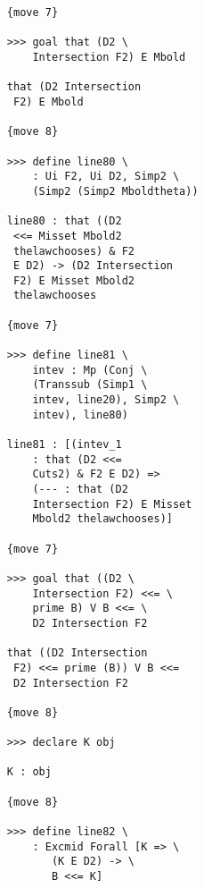 \documentclass[12pt]{article}
\begin{document}
\begin{verbatim}
                        {move 7}

                        >>> goal that (D2 \
                            Intersection F2) E Mbold

                        that (D2 Intersection 
                         F2) E Mbold

                        {move 8}

                        >>> define line80 \
                            : Ui F2, Ui D2, Simp2 \
                            (Simp2 (Simp2 Mboldtheta))

                        line80 : that ((D2 
                         <<= Misset Mbold2 
                         thelawchooses) & F2 
                         E D2) -> (D2 Intersection 
                         F2) E Misset Mbold2 
                         thelawchooses

                        {move 7}

                        >>> define line81 \
                            intev : Mp (Conj \
                            (Transsub (Simp1 \
                            intev, line20), Simp2 \
                            intev), line80)

                        line81 : [(intev_1 
                            : that (D2 <<= 
                            Cuts2) & F2 E D2) => 
                            (--- : that (D2 
                            Intersection F2) E Misset 
                            Mbold2 thelawchooses)]

                        {move 7}

                        >>> goal that ((D2 \
                            Intersection F2) <<= \
                            prime B) V B <<= \
                            D2 Intersection F2

                        that ((D2 Intersection 
                         F2) <<= prime (B)) V B <<= 
                         D2 Intersection F2

                        {move 8}

                        >>> declare K obj

                        K : obj

                        {move 8}

                        >>> define line82 \
                            : Excmid Forall [K => \
                               (K E D2) -> \
                               B <<= K]


\end{verbatim}
\end{document}
